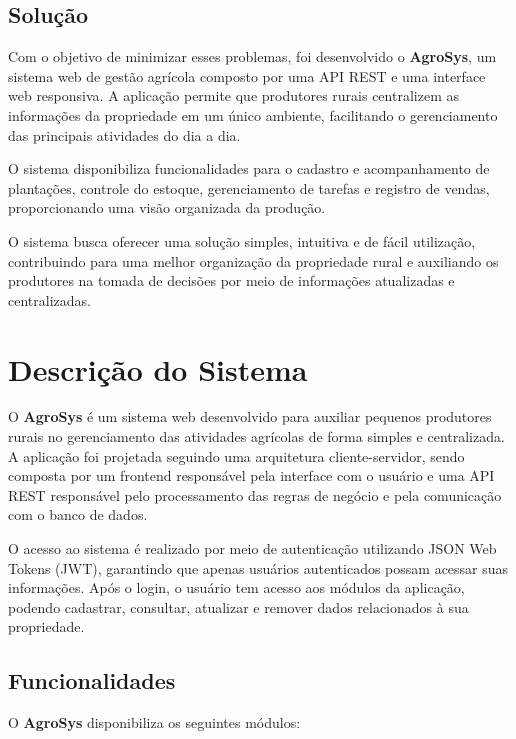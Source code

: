 \documentclass[12pt]{article}
\begin{document}
\subsection{Solução}

Com o objetivo de minimizar esses problemas, foi desenvolvido o \textbf{AgroSys}, um sistema web de gestão agrícola composto por uma API REST e uma interface web responsiva. A aplicação permite que produtores rurais centralizem as informações da propriedade em um único ambiente, facilitando o gerenciamento das principais atividades do dia a dia.

O sistema disponibiliza funcionalidades para o cadastro e acompanhamento de plantações, controle do estoque, gerenciamento de tarefas e registro de vendas, proporcionando uma visão organizada da produção.

O sistema busca oferecer uma solução simples, intuitiva e de fácil utilização, contribuindo para uma melhor organização da propriedade rural e auxiliando os produtores na tomada de decisões por meio de informações atualizadas e centralizadas.


\section{Descrição do Sistema}
O \textbf{AgroSys} é um sistema web desenvolvido para auxiliar pequenos produtores rurais no gerenciamento das atividades agrícolas de forma simples e centralizada. A aplicação foi projetada seguindo uma arquitetura cliente-servidor, sendo composta por um frontend responsável pela interface com o usuário e uma API REST responsável pelo processamento das regras de negócio e pela comunicação com o banco de dados.

O acesso ao sistema é realizado por meio de autenticação utilizando JSON Web Tokens (JWT), garantindo que apenas usuários autenticados possam acessar suas informações. Após o login, o usuário tem acesso aos módulos da aplicação, podendo cadastrar, consultar, atualizar e remover dados relacionados à sua propriedade.

\subsection{Funcionalidades}
O \textbf{AgroSys} disponibiliza os seguintes módulos:
\end{document}
